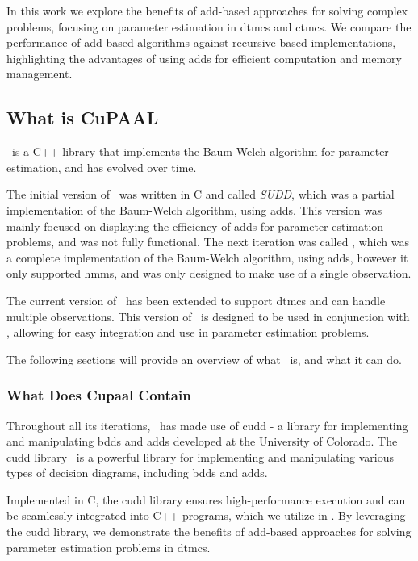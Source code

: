 In this work we explore the benefits of \gls{add}-based approaches for solving complex problems, focusing on parameter estimation in \glspl{dtmc} and \glspl{ctmc}.
We compare the performance of \gls{add}-based algorithms against recursive-based implementations, highlighting the advantages of using \glspl{add} for efficient computation and memory management.

\subsection{What is CuPAAL}\label{subsec:what_is_cupaal}
\Cupaal\ is a C++ library that implements the Baum-Welch algorithm for parameter estimation, and has evolved over time.

The initial version of \Cupaal\ was written in C and called \textit{SUDD}, which was a partial implementation of the Baum-Welch algorithm, using \glspl{add}.
This version was mainly focused on displaying the efficiency of \glspl{add} for parameter estimation problems, and was not fully functional.
The next iteration was called \Cupaal, which was a complete implementation of the Baum-Welch algorithm, using \glspl{add}, however it only supported \glspl{hmm}, and was only designed to make use of a single observation.

The current version of \Cupaal\ has been extended to support \glspl{dtmc} and can handle multiple observations.
This version of \Cupaal\ is designed to be used in conjunction with \Jajapy, allowing for easy integration and use in parameter estimation problems.

The following sections will provide an overview of what \Cupaal\ is, and what it can do.

\subsubsection{What Does Cupaal Contain}\label{subsec:what_does_cupaal_contain}
Throughout all its iterations, \Cupaal\ has made use of \gls{cudd} - a library for implementing and manipulating \glspl{bdd} and \glspl{add} developed at the University of Colorado.
The \gls{cudd} library~\cite{somenzi1997cudd} is a powerful library for implementing and manipulating various types of decision diagrams, including \glspl{bdd} and \glspl{add}.

Implemented in C, the \gls{cudd} library ensures high-performance execution and can be seamlessly integrated into C++ programs, which we utilize in \Cupaal.
By leveraging the \gls{cudd} library, we demonstrate the benefits of \gls{add}-based approaches for solving parameter estimation problems in \glspl{dtmc}.

